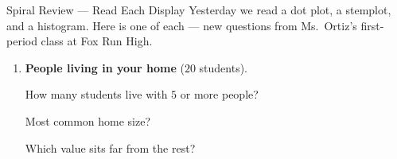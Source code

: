 \documentclass[12pt]{article}
\begin{document}

\vspace{0.15in}

\boxguard
\begin{notesbox}{Spiral Review --- Read Each Display}
\normalsize
Yesterday we read a dot plot, a stemplot, and a histogram. Here is one of each --- new
questions from Ms.~Ortiz's first-period class at Fox Run High.

\begin{enumerate}[leftmargin=1.8em, itemsep=30pt, topsep=10pt]

  \item \textbf{People living in your home} ($20$ students).\par\vspace{4pt}
        \begin{minipage}[t]{0.50\linewidth}\vspace{0pt}\centering
        \end{minipage}\hfill
        \begin{minipage}[t]{0.46\linewidth}\vspace{0pt}\raggedright
        How many students live with $5$ or more people? \blank{1.6cm}\par\vspace{10pt}
        Most common home size? \blank{2.4cm}\par\vspace{10pt}
        Which value sits far from the rest?\par\blank{2.4cm}
        \end{minipage}


\end{enumerate}
\end{notesbox}
\end{document}
